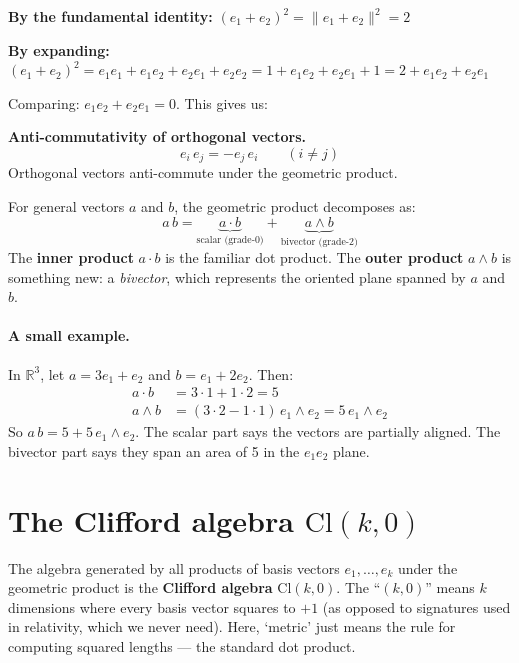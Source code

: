 \documentclass[11pt, twoside, openright]{memoir}
\newcommand{\ip}{\cdot}           %
\newcommand{\op}{\wedge}          %
\numberwithin{equation}{chapter}
\begin{document}
\textbf{By the fundamental identity:}
$(e_1 + e_2)^2 = \|e_1 + e_2\|^2 = 2$

\textbf{By expanding:}
$(e_1 + e_2)^2 = e_1 e_1 + e_1 e_2 + e_2 e_1 + e_2 e_2
= 1 + e_1 e_2 + e_2 e_1 + 1 = 2 + e_1 e_2 + e_2 e_1$

Comparing: $e_1 e_2 + e_2 e_1 = 0$.  This gives us:

\begin{gabox}
\textbf{Anti-commutativity of orthogonal vectors.}
\begin{equation}
  e_i \, e_j = -e_j \, e_i \qquad (i \neq j)
\end{equation}
Orthogonal vectors anti-commute under the geometric product.
\end{gabox}

For general vectors $a$ and $b$, the geometric product decomposes as:
\begin{equation}
  a \, b = \underbrace{a \ip b}_{\text{scalar (grade-0)}}
         + \underbrace{a \op b}_{\text{bivector (grade-2)}}
\end{equation}
The \textbf{inner product} $a \ip b$ is the familiar dot product.
The \textbf{outer product} $a \op b$ is something new: a
\emph{bivector}, which represents the oriented plane spanned by $a$
and $b$.

\paragraph{A small example.}
In $\mathbb{R}^3$, let $a = 3e_1 + e_2$ and $b = e_1 + 2e_2$.  Then:
\begin{align}
  a \ip b &= 3 \cdot 1 + 1 \cdot 2 = 5 \\
  a \op b &= (3 \cdot 2 - 1 \cdot 1)\, e_1 \op e_2
           = 5 \, e_1 \op e_2
\end{align}
So $a\,b = 5 + 5\,e_1 \op e_2$.
The scalar part says the vectors are partially aligned.  The bivector
part says they span an area of 5 in the $e_1 e_2$ plane.

\section{The Clifford algebra $\mathrm{Cl}(k, 0)$}

The algebra generated by all products of basis vectors $e_1, \ldots, e_k$
under the geometric product is the \textbf{Clifford algebra}
$\mathrm{Cl}(k, 0)$.  The ``$(k, 0)$'' means $k$ dimensions where every basis vector squares to $+1$ (as opposed to signatures used in relativity, which we never need). Here, `metric' just means the rule for computing squared lengths --- the standard dot product.
\end{document}
